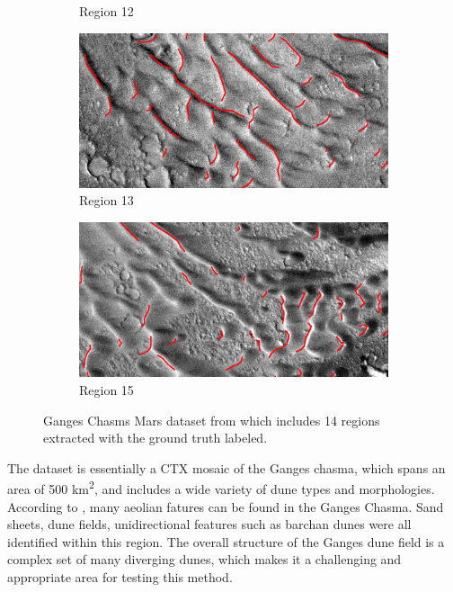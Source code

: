 \begin{figure}[htbp]
\begin{subfigure}[b]{0.3\textwidth}
		\caption{  Region 12 }
		\label{fig:area12_image}
	\end{subfigure}
	\begin{subfigure}[b]{0.3\textwidth}
		\centering
		\includegraphics[width=\textwidth]{figures/area13_with_gt}
		\caption{  Region 13 }
		\label{fig:area13_image}
	\end{subfigure}
	\begin{subfigure}[b]{0.3\textwidth}
		\centering
		\includegraphics[width=\textwidth]{figures/area15_with_gt}
		\caption{  Region 15 }
		\label{fig:area15_image}
	\end{subfigure}

	\caption{Ganges Chasms Mars dataset from \cite{vaz_object_based_dune_analysis} which includes 14 regions extracted with the ground truth labeled. }
	\label{fig:mars_ganges_dataset}
\end{figure}



The dataset is essentially a CTX mosaic of the Ganges chasma, which spans an area of 500 km\textsuperscript{2}, and includes a wide variety of dune types and morphologies. According to \cite{fenton_aeolian_sediment_ganges_chasma_mars}, many aeolian fatures can be found in the Ganges Chasma. Sand sheets, dune fields, unidirectional features such as barchan dunes were all identified within this region. The overall structure of the Ganges dune field is a complex set of many diverging dunes, which makes it a challenging and appropriate area for testing this method. 


